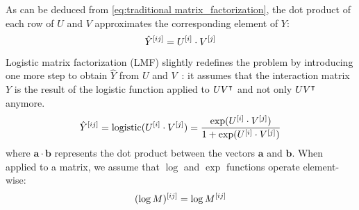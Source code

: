 As can be deduced from \autoref{eq:traditional matrix_factorization}, the dot product of each row of $U$ and $V$ approximates the corresponding element of $Y$:
%
\begin{equation}
    \hat Y^{[ij]} = U^{[i]} \cdot V^{[j]}
\end{equation}
%
Logistic matrix factorization (LMF) slightly redefines the problem by introducing one more step to obtain $\hat Y$ from $U$ and $V$~\cite{johnsonlogistic}: it assumes that the interaction matrix $Y$ is the result of the logistic function applied to $UV^\intercal$ and not only $UV^\intercal$ anymore.
%
\begin{equation}
    \hat Y^{[ij]} = \text{logistic}(U^{[i]} \cdot V^{[j]})
    = \frac{\exp(U^{[i]} \cdot V^{[j]})}{1 + \exp(U^{[i]} \cdot V^{[j]})}
    \label{eq:lmf_prediction}
\end{equation}
%
where $\mathbf{a} \cdot \mathbf{b}$ represents the dot product between the vectors $\mathbf{a}$ and $\mathbf{b}$. When applied to a matrix, we assume that $\log$ and $\exp$ functions operate element-wise:
%
\begin{equation*}
    (\log M)^{[ij]} = \log M^{[ij]}
\end{equation*}

